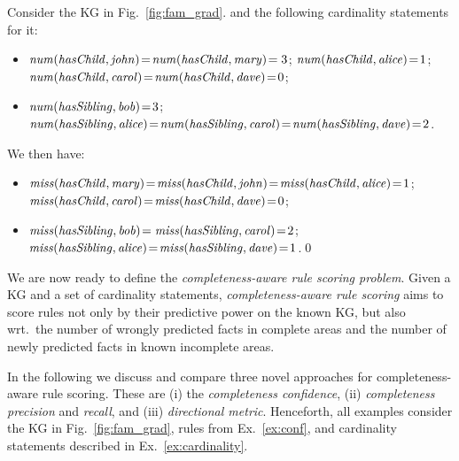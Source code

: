 \begin{example}
\label{ex:cardinality}
Consider the KG in Fig.~\ref{fig:fam_grad}.
and the following cardinality statements for it: %
\vspace{-\topsep}
\begin{itemize}
\setlength{\parskip}{0pt}
\setlength{\itemsep}{0pt plus 1pt}
\item $\mathit{num(hasChild,john)}\!=\!\mathit{num(hasChild,mary)}\!=3$; $\mathit{num(hasChild,alice)}\!=\!1$;\\  $\mathit{num(hasChild,carol)}\!=\!\mathit{num(hasChild,dave)}\!=\!0$;
\item $\mathit{num(hasSibling,bob)}\!=\!3$;
      $\mathit{num(hasSibling,alice)}\!=\!\mathit{num(hasSibling,carol)}\!=\!\mathit{num(hasSibling,dave)}\!=\!2$.
\end{itemize}
\vspace{-\topsep}
We then have:
\vspace{-\topsep}
\begin{itemize}
\setlength{\parskip}{0pt}
\setlength{\itemsep}{0pt plus 1pt}
\item $\mathit{miss(hasChild,mary)}\!=\!\mathit{miss(hasChild,john)}\!=\!\mathit{miss(hasChild,alice)}\!=\!1$;\\
      $\mathit{miss(hasChild,carol)}\!=\!\mathit{miss(hasChild,dave)}\!=\!0$; 
\item $\mathit{miss(hasSibling,bob)}\!=\mathit{miss(hasSibling,carol)}\!=\!2$;\\ 
      $\mathit{miss(hasSibling,alice)}\!=\!\mathit{miss(hasSibling,dave)}\!=\!1$.\qed
\end{itemize}
\end{example}


We are now ready to 
define the \emph{completeness-aware rule scoring problem}.
Given a KG and a set of 
cardinality statements, \emph{completeness-aware rule scoring} aims to score rules not only by their predictive power on the known KG, but also wrt.\ the number of wrongly predicted facts  
in complete areas and the number of newly predicted 
facts in known incomplete areas.

In the following we discuss and compare  
three novel approaches for completeness-aware rule scoring. These are (i) the \emph{completeness confidence}, (ii) \emph{completeness precision} and \emph{recall}, 
and (iii) \emph{directional metric}.
Henceforth, all examples 
consider the KG in Fig.~\ref{fig:fam_grad}, 
rules from Ex.~\ref{ex:conf}, and cardinality statements  described in Ex.~\ref{ex:cardinality}.

